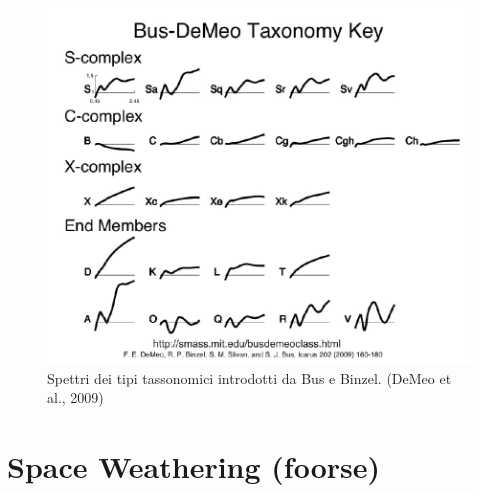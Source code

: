 \documentclass[a4paper,11pt,openright]{book}
\begin{document}
\begin{figure}[t]
    \centering
    \includegraphics[scale=0.44]{figure/spettro_bus.jpg}
    \caption{Spettri dei tipi tassonomici introdotti da Bus e Binzel. (DeMeo et al., 2009)}
    \label{spettro_bus}
\end{figure}
\section{Space Weathering (foorse)}
\end{document}
